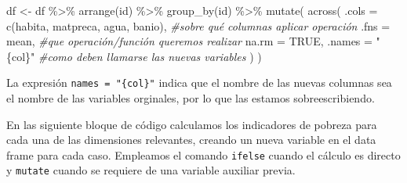 \documentclass[
]{book}
\newenvironment{Shaded}{\begin{snugshade}}{\end{snugshade}}
\newcommand{\AttributeTok}[1]{\textcolor[rgb]{0.77,0.63,0.00}{#1}}
\newcommand{\CommentTok}[1]{\textcolor[rgb]{0.56,0.35,0.01}{\textit{#1}}}
\newcommand{\ConstantTok}[1]{\textcolor[rgb]{0.00,0.00,0.00}{#1}}
\newcommand{\FunctionTok}[1]{\textcolor[rgb]{0.00,0.00,0.00}{#1}}
\newcommand{\NormalTok}[1]{#1}
\newcommand{\OtherTok}[1]{\textcolor[rgb]{0.56,0.35,0.01}{#1}}
\newcommand{\SpecialCharTok}[1]{\textcolor[rgb]{0.00,0.00,0.00}{#1}}
\newcommand{\StringTok}[1]{\textcolor[rgb]{0.31,0.60,0.02}{#1}}
\begin{document}
\begin{Shaded}
\begin{Highlighting}[]
\NormalTok{df }\OtherTok{\textless{}{-}}\NormalTok{ df }\SpecialCharTok{\%\textgreater{}\%} \FunctionTok{arrange}\NormalTok{(id) }\SpecialCharTok{\%\textgreater{}\%} \FunctionTok{group\_by}\NormalTok{(id) }\SpecialCharTok{\%\textgreater{}\%}
      \FunctionTok{mutate}\NormalTok{(}
        \FunctionTok{across}\NormalTok{(}
         \AttributeTok{.cols  =} \FunctionTok{c}\NormalTok{(habita, matpreca, agua, banio), }\CommentTok{\#sobre qué columnas aplicar operación}
         \AttributeTok{.fns   =}\NormalTok{ mean,   }\CommentTok{\#que operación/función queremos realizar}
          \AttributeTok{na.rm =} \ConstantTok{TRUE}\NormalTok{,                                 }
         \AttributeTok{.names =} \StringTok{"\{col\}"} \CommentTok{\#como deben llamarse las nuevas variables}
\NormalTok{                )}
\NormalTok{                  )}
\end{Highlighting}
\end{Shaded}

La expresión \texttt{names\ =\ "\{col\}"} indica que el nombre de las nuevas columnas sea el nombre de las variables orginales, por lo que las estamos sobreescribiendo.

En las siguiente bloque de código calculamos los indicadores de pobreza para cada una de las dimensiones relevantes, creando un nueva variable en el data frame para cada caso. Empleamos el comando \texttt{ifelse} cuando el cálculo es directo y \texttt{mutate} cuando se requiere de una variable auxiliar previa.
\end{document}
